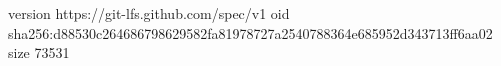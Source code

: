 version https://git-lfs.github.com/spec/v1
oid sha256:d88530c264686798629582fa81978727a2540788364e685952d343713ff6aa02
size 73531
